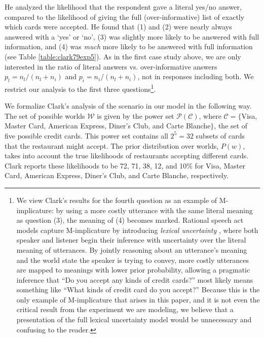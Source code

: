 \documentclass[12pt, floatsintext, jou]{apa6}
\begin{document}
He analyzed the likelihood that the respondent gave a literal yes/no answer, compared to the likelihood of giving the full (over-informative) list of exactly which cards were accepted.  He found that (1) and (2) were nearly always answered with a `yes' or `no', (3) was slightly more likely to be answered with full information, and (4) was \emph{much} more likely to be answered with full information (see Table \ref{table:clark79exp5}). As in the first case study above, we are only interested in the ratio of literal answers vs. over-informative answers $p_l = n_l/(n_l + n_i)$ and $p_i = n_i/(n_l + n_i)$, not in responses including both. We restrict our analysis to the first three questions\footnote{We view Clark's results for the fourth question as an example of M-implicature: by using a more costly utterance with the same literal meaning as question (3), the meaning of (4) becomes marked. Rational speech act models capture M-implicature by introducing \emph{lexical uncertainty} \cite{BergenGoodmanLevy12_Alternatives}, where both speaker and listener begin their inference with uncertainty over the literal meaning of utterances. By jointly reasoning about an utterance's meaning and the world state the speaker is trying to convey, more costly utterances are mapped to meanings with lower prior probability, allowing a pragmatic inference that ``Do you accept any kinds of credit cards?'' most likely means something like ``What kinds of credit card do you accept?'' Because this is the only example of M-implicature that arises in this paper, and it is not even the critical result from the experiment we are modeling, we believe that a presentation of the full lexical uncertainty model would be unnecessary and confusing to the reader.}.

We formalize Clark's analysis of the scenario in our model in the following way. The set of possible worlds $\mathcal{W}$ is given by the power set $\mathcal{P}(\mathcal{C})$, where $\mathcal{C} = \{$Visa, Master Card, American Express, Diner's Club, and Carte Blanche$\}$, the set of five possible credit cards. This power set contains all $2^5 = 32$ subsets of cards that the restaurant might accept. The prior distribution over worlds, $P(w)$, takes into account the true likelihoods of restaurants accepting different cards. Clark reports these likelihoods to be 72, 71, 38, 12, and 10\% for Visa, Master Card, American Express, Diner's Club, and Carte Blanche, respectively. 
\end{document}
